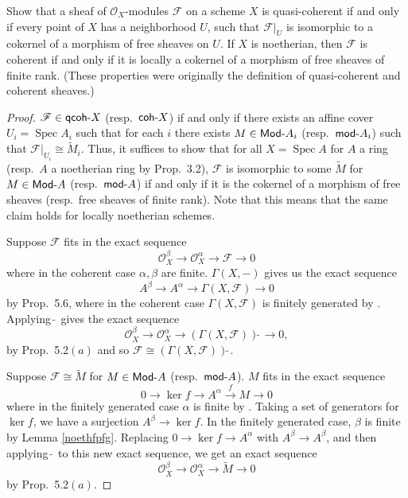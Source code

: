 \documentclass[10pt]{article}
\theoremstyle{definition}
\theoremstyle{remark}
\numberwithin{equation}{section}
\numberwithin{figure}{subsubsection}
\DeclareMathOperator{\Spec}{Spec}
\newcommand{\FF}{\mathscr{F}}
\newcommand{\OO}{\mathcal{O}}
\newcommand{\Mod}{\mathsf{mod}\mathchar`-}
\newcommand{\MOD}{\mathsf{Mod}\mathchar`-}
\newcommand{\qcoh}{\mathsf{qcoh}\mathchar`-}
\newcommand{\coh}{\mathsf{coh}\mathchar`-}
\begin{document}
\begin{problem}
  Show that a sheaf of $\OO_X$-modules $\FF$ on a scheme $X$ is quasi-coherent if and only if every point of $X$ has a neighborhood $U$, such that $\FF\vert_U$ is isomorphic to a cokernel of a morphism of free sheaves on $U$. If $X$ is noetherian, then $\FF$ is coherent if and only if it is locally a cokernel of a morphism of free sheaves of finite rank. (These properties were originally the definition of quasi-coherent and coherent sheaves.)
\end{problem}
\begin{proof}
  $\FF \in \qcoh X$ (resp.~$\coh X$) if and only if there exists an affine cover $U_i = \Spec A_i$ such that for each $i$ there exists $M \in \MOD A_i$ (resp.~$\Mod A_i$) such that $\FF\vert_{U_i} \cong \tilde{M}_i$. Thus, it suffices to show that for all $X = \Spec A$ for $A$ a ring (resp.~$A$ a noetherian ring by Prop.~3.2), $\FF$ is isomorphic to some $\tilde{M}$ for $M \in \MOD A$ (resp.~$\Mod A$) if and only if it is the cokernel of a morphism of free sheaves (resp.~free sheaves of finite rank). Note that this means that the same claim holds for locally noetherian schemes.
  \par Suppose $\FF$ fits in the exact sequence
  \begin{equation*}
    \OO_X^\beta \longrightarrow \OO_X^\alpha \longrightarrow \FF \longrightarrow 0
  \end{equation*}
  where in the coherent case $\alpha,\beta$ are finite. $\Gamma(X,-)$ gives us the exact sequence
  \begin{equation*}
    A^\beta \longrightarrow A^\alpha \longrightarrow \Gamma(X,\FF) \longrightarrow 0
  \end{equation*}
  by Prop.~5.6, where in the coherent case $\Gamma(X,\FF)$ is finitely generated by \cite[Prop.~2.3]{AM69}. Applying $\tilde{~}$ gives the exact sequence
  \begin{equation*}
    \OO_X^\beta \longrightarrow \OO_X^\alpha \longrightarrow (\Gamma(X,\FF))\tilde{~} \longrightarrow 0,
  \end{equation*}
  by Prop.~5.2$(a)$ and so $\FF \cong (\Gamma(X,\FF))\tilde{~}$.
  \par Suppose $\FF \cong \tilde{M}$ for $M \in \MOD A$ (resp.~$\Mod A$). $M$ fits in the exact sequence
  \begin{equation*}
    0 \longrightarrow \ker f \longrightarrow A^\alpha \overset{f}{\longrightarrow} M \longrightarrow 0
  \end{equation*}
  where in the finitely generated case $\alpha$ is finite by
  \cite[Prop.~2.3]{AM69}. Taking a set of generators for $\ker f$, we have a
  surjection $A^\beta \to \ker f$. In the finitely generated case, $\beta$ is
  finite by Lemma \ref{noethfpfg}. Replacing $0 \to \ker f \to A^\alpha$ with $A^\beta \to A^\beta$, and then applying $\tilde{~}$ to this new exact sequence, we get an exact sequence
  \begin{equation*}
    \OO_X^\beta \longrightarrow\OO_X^\alpha \longrightarrow \tilde{M} \longrightarrow 0
  \end{equation*}
  by Prop.~5.2$(a)$.
\end{proof}
\end{document}
